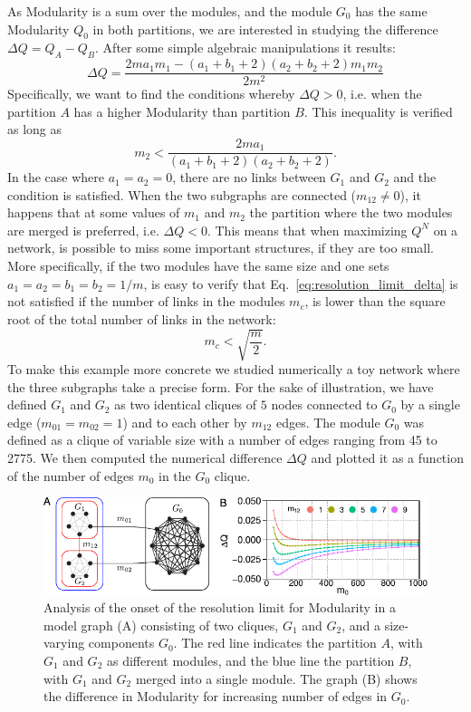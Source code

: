 As Modularity is a sum over the modules, and the module $G_0$ has the same Modularity $Q_0$ in both partitions, we are interested in studying the difference $\Delta Q = Q_{A} - Q_{B}$. After some simple algebraic manipulations it results:
\begin{equation} \label{eq:resolution_limit_delta}
\Delta Q = \frac{2 m a_1 m_1 - (a_1+b_1+2)(a_2+b_2+2)m_1 m_2}{2m^2}
\end{equation}
Specifically, we want to find the conditions whereby $\Delta Q > 0$, i.e. when the partition $A$ has a higher Modularity than partition $B$. This inequality is verified as long as
\begin{equation}
m_2 < \frac{2m a_1}{(a_1+b_1+2)(a_2+b_2+2)}.
\end{equation}
In the case where $a_1=a_2=0$, there are no links between $G_1$ and $G_2$ and the condition is satisfied. When the two subgraphs are connected ($m_{12} \neq 0$), it happens that at some values of $m_1$ and $m_2$ the partition where the two modules are merged is preferred, i.e. $\Delta Q <0$. This means that when maximizing $Q^N$ on a network, is possible to miss some important structures, if they are too small.
More specifically, if the two modules have the same size and one sets $a_1=a_2=b_1=b_2=1/m$, is easy to verify that Eq.~\ref{eq:resolution_limit_delta} is not satisfied if the number of links in the modules $m_c$, is lower than the square root of the total number of links in the network:
\begin{equation}
m_c < \sqrt{\frac{m}{2}}.
\end{equation}
To make this example more concrete we studied numerically a toy network where the three subgraphs take a precise form.
For the sake of illustration, we have defined $G_1$ and $G_2$ as two identical cliques of $5$ nodes connected to $G_0$ by a single edge ($m_{01}=m_{02}=1$) and to each other by $m_{12}$ edges.
The module $G_0$ was defined as a clique of variable size with a number of edges ranging from 45 to 2775. We then computed the numerical difference $\Delta Q$ and plotted it as a function of the number of edges $m_0$ in the $G_0$ clique.

\begin{figure}[htb!]
\centering
\includegraphics[width=1\textwidth]{images/barthelemy_modularity.pdf}
\caption{Analysis of the onset of the resolution limit for Modularity in a model graph (A) consisting of two cliques, $G_1$ and $G_2$, and a size-varying components $G_0$. The red line indicates the partition $A$, with $G_1$ and $G_2$ as different modules, and the blue line the partition $B$, with $G_1$ and $G_2$ merged into a single module. The graph (B) shows the difference in Modularity for increasing number of edges in $G_0$.}
\label{fig:figure_1_barthelemy}
\end{figure}

